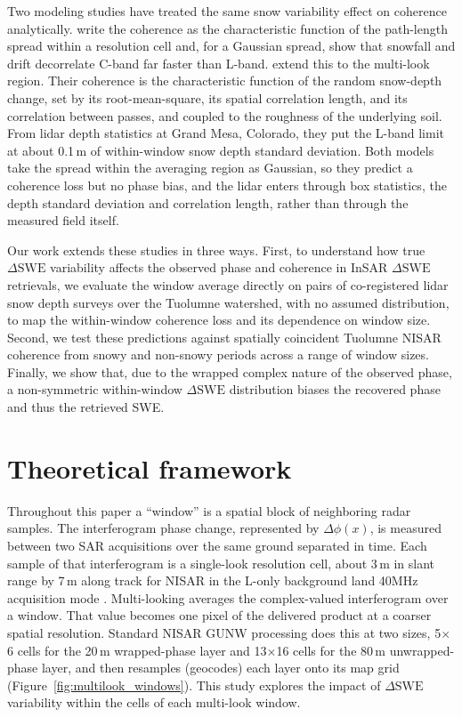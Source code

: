 \documentclass[tc, manuscript]{copernicus}
\begin{document}
Two modeling studies have treated the same snow variability effect on coherence analytically. \citet{Rott2003} write the coherence as the characteristic function of the path-length spread within a resolution cell and, for a Gaussian spread, show that snowfall and drift decorrelate C-band far faster than L-band. \citet{yueh2026interferometric-3ba} extend this to the multi-look region. Their coherence is the characteristic function of the random snow-depth change, set by its root-mean-square, its spatial correlation length, and its correlation between passes, and coupled to the roughness of the underlying soil. From lidar depth statistics at Grand Mesa, Colorado, they put the L-band limit at about 0.1\,\unit{m} of within-window snow depth standard deviation. Both models take the spread within the averaging region as Gaussian, so they predict a coherence loss but no phase bias, and the lidar enters through box statistics, the depth standard deviation and correlation length, rather than through the measured field itself.

Our work extends these studies in three ways. First, to understand how true $\Delta\mathrm{SWE}$ variability affects the observed phase and coherence in InSAR $\Delta\mathrm{SWE}$ retrievals, we evaluate the window average directly on pairs of co-registered lidar snow depth surveys over the Tuolumne watershed, with no assumed distribution, to map the within-window coherence loss and its dependence on window size. Second, we test these predictions against spatially coincident Tuolumne NISAR coherence from snowy and non-snowy periods across a range of window sizes. Finally, we show that, due to the wrapped complex nature of the observed phase, a non-symmetric within-window $\Delta\mathrm{SWE}$ distribution biases the recovered phase and thus the retrieved SWE.

\section{Theoretical framework}\label{sec:theoretical-framework}

Throughout this paper a ``window'' is a spatial block of neighboring radar samples. The interferogram phase change, represented by $\Delta\phi (x)$, is measured between two SAR acquisitions over the same ground separated in time. Each sample of that interferogram is a single-look resolution cell, about 3\,\unit{m} in slant range by 7\,\unit{m} along track for NISAR in the L-only background land 40MHz acquisition mode \citep{nisar2025handbook}. Multi-looking averages the complex-valued interferogram over a window. That value becomes one pixel of the delivered product at a coarser spatial resolution. Standard NISAR GUNW processing does this at two sizes, 5$\times$6 cells for the 20\,\unit{m} wrapped-phase layer and 13$\times$16 cells for the 80\,\unit{m} unwrapped-phase layer, and then resamples (geocodes) each layer onto its map grid (Figure~\ref{fig:multilook_windows}). This study explores the impact of $\Delta\mathrm{SWE}$ variability within the cells of each multi-look window.
\end{document}
